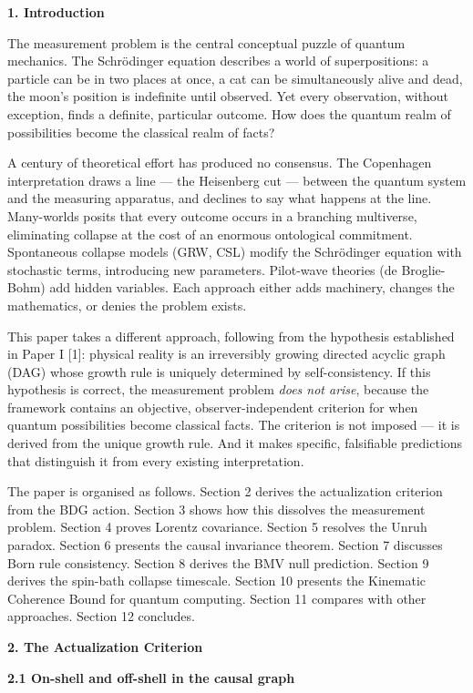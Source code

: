 \documentclass[12pt,a4paper]{article}
\begin{document}
\textbf{1. Introduction}

The measurement problem is the central conceptual puzzle of quantum
mechanics. The Schrödinger equation describes a world of superpositions:
a particle can be in two places at once, a cat can be simultaneously
alive and dead, the moon's position is indefinite until observed. Yet
every observation, without exception, finds a definite, particular
outcome. How does the quantum realm of possibilities become the
classical realm of facts?

A century of theoretical effort has produced no consensus. The
Copenhagen interpretation draws a line --- the Heisenberg cut ---
between the quantum system and the measuring apparatus, and declines to
say what happens at the line. Many-worlds posits that every outcome
occurs in a branching multiverse, eliminating collapse at the cost of an
enormous ontological commitment. Spontaneous collapse models (GRW, CSL)
modify the Schrödinger equation with stochastic terms, introducing new
parameters. Pilot-wave theories (de Broglie-Bohm) add hidden variables.
Each approach either adds machinery, changes the mathematics, or denies
the problem exists.

This paper takes a different approach, following from the hypothesis
established in Paper I {[}1{]}: physical reality is an irreversibly
growing directed acyclic graph (DAG) whose growth rule is uniquely
determined by self-consistency. If this hypothesis is correct, the
measurement problem \emph{does not arise}, because the framework
contains an objective, observer-independent criterion for when quantum
possibilities become classical facts. The criterion is not imposed ---
it is derived from the unique growth rule. And it makes specific,
falsifiable predictions that distinguish it from every existing
interpretation.

The paper is organised as follows. Section 2 derives the actualization
criterion from the BDG action. Section 3 shows how this dissolves the
measurement problem. Section 4 proves Lorentz covariance. Section 5
resolves the Unruh paradox. Section 6 presents the causal invariance
theorem. Section 7 discusses Born rule consistency. Section 8 derives
the BMV null prediction. Section 9 derives the spin-bath collapse
timescale. Section 10 presents the Kinematic Coherence Bound for quantum
computing. Section 11 compares with other approaches. Section 12
concludes.

\textbf{2. The Actualization Criterion}

\textbf{2.1 On-shell and off-shell in the causal graph}
\end{document}
